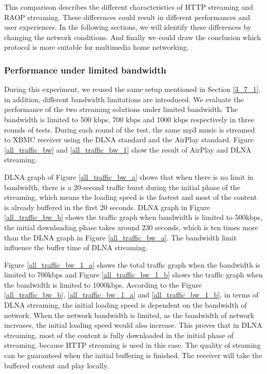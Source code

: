 This comparison describes the different characteristics of HTTP streaming and RAOP streaming. These differences could result in different performances and user experiences. In the following sections, we will identify these differences by changing the network conditions. And finally we could draw the conclusion which protocol is more suitable for multimedia home networking.
\subsubsection{Performance under limited bandwidth\label{4_1_2}}
During this experiment, we reused the same setup mentioned in Section \ref{3_7_1}, in addition, different bandwidth limitations are introduced. We evaluate the performance of the two streaming solutions under limited bandwidth. The bandwidth is limited to 500 kbps, 700 kbps and 1000 kbps respectively in three rounds of tests. During each round of the test, the same mp3 music is streamed to XBMC receiver using the DLNA standard and the AirPlay standard. Figure \ref{all_traffic_bw} and \ref{all_traffic_bw_1} show the result of AirPlay and DLNA streaming.

DLNA graph of Figure \ref{all_traffic_bw_a} shows that when there is no limit
in bandwidth, there is a 20-second traffic burst during the initial phase of the
streaming, which means the loading speed is the fastest and most of the content is already buffered in the first 20 seconds. DLNA graph in Figure \ref{all_traffic_bw_b} shows the traffic graph when bandwidth is limited to 500kbps, the initial downloading phase takes around 230 seconds, which is ten times more than the DLNA graph in Figure \ref{all_traffic_bw_a}. The bandwidth limit influence the buffer time of DLNA streaming.

Figure \ref{all_traffic_bw_1_a} shows the total traffic graph when the bandwidth is limited to 700kbps and Figure \ref{all_traffic_bw_1_b} shows the traffic graph when the bandwidth is limited to 1000kbps. According to the Figure \ref{all_traffic_bw_b}, \ref{all_traffic_bw_1_a} and \ref{all_traffic_bw_1_b}, in terms of DLNA streaming, the initial loading speed is dependent on the bandwidth of network. When the network bandwidth is limited, as the bandwidth of network increases, the initial loading speed would also increase. This proves that in DLNA streaming, most of the content is fully downloaded in the initial phase of streaming, because HTTP streaming is used in this case. The quality of steaming can be guaranteed when the initial buffering is finished. The receiver will take the buffered content and play locally.

